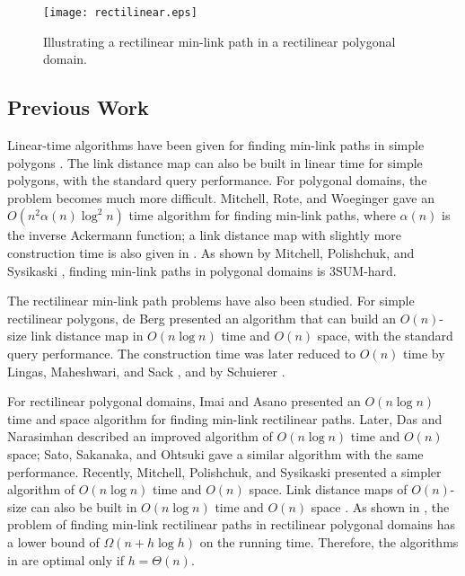 \documentclass[english,runningheads,11pt]{llncs-revised}
\begin{document}
\begin{figure}[t]
\begin{minipage}[t]{\linewidth}
\begin{center}
\texttt{[image: rectilinear.eps]}
\caption{\footnotesize Illustrating a rectilinear min-link path in
a rectilinear polygonal domain.}
\label{fig:rectilinear}
\end{center}
\end{minipage}
\vspace*{-0.15in}
\end{figure}


\subsection{Previous Work}

Linear-time algorithms have been given for finding min-link paths in simple polygons
\cite{ref:GhoshCo91,ref:HershbergerCo94,ref:SuriA86,ref:SuriMi87,ref:SuriOn90}.
The link distance map can also be built in
linear time \cite{ref:SuriA86,ref:SuriMi87,ref:SuriOn90} for simple
polygons, with the standard query performance.
For polygonal domains, the problem becomes much more
difficult.
Mitchell, Rote, and Woeginger \cite{ref:MitchellMi92}
gave an $O(n^2\alpha(n)\log^2n)$ time
algorithm for finding min-link paths, where $\alpha(n)$
is the inverse Ackermann function; a link distance map with slightly more
construction time is also given in \cite{ref:MitchellMi92}.
As shown by Mitchell, Polishchuk, and Sysikaski
\cite{ref:MitchellMi14}, finding
min-link paths in polygonal domains is 3SUM-hard.


The rectilinear min-link path problems have also been studied.
For simple rectilinear polygons, de Berg \cite{ref:deBergOn91}
presented an algorithm that can build an $O(n)$-size
link distance map in $O(n\log n)$ time and $O(n)$ space, with the standard query
performance. The construction time was later reduced
to $O(n)$ time by Lingas, Maheshwari, and Sack
\cite{ref:LingasOp95}, and by Schuierer \cite{ref:SchuiererAn96}.

For rectilinear polygonal domains, Imai and
Asano \cite{ref:ImaiEf86} presented an $O(n\log n)$  time and space
algorithm for finding min-link rectilinear paths.
Later, Das and Narasimhan \cite{ref:DasGe91} described an
improved algorithm of $O(n\log n)$ time and $O(n)$ space; Sato,
Sakanaka, and Ohtsuki \cite{ref:SatoA87} gave a similar algorithm with the same
performance.
Recently, Mitchell, Polishchuk, and Sysikaski \cite{ref:MitchellMi14}
presented a simpler algorithm of $O(n\log n)$ time and $O(n)$ space.
Link distance maps of $O(n)$-size can also be built in $O(n\log n)$
time and $O(n)$ space \cite{ref:DasGe91,ref:MitchellMi14}.
As shown in \cite{ref:DasGe91,ref:MaheshwariLi00}, the problem of finding min-link
rectilinear paths in rectilinear polygonal domains has a lower bound
of $\Omega(n+ h\log h)$ on the running time. Therefore, the algorithms in
\cite{ref:DasGe91,ref:MitchellMi14,ref:SatoA87} are optimal only if
$h=\Theta(n)$.
\end{document}
